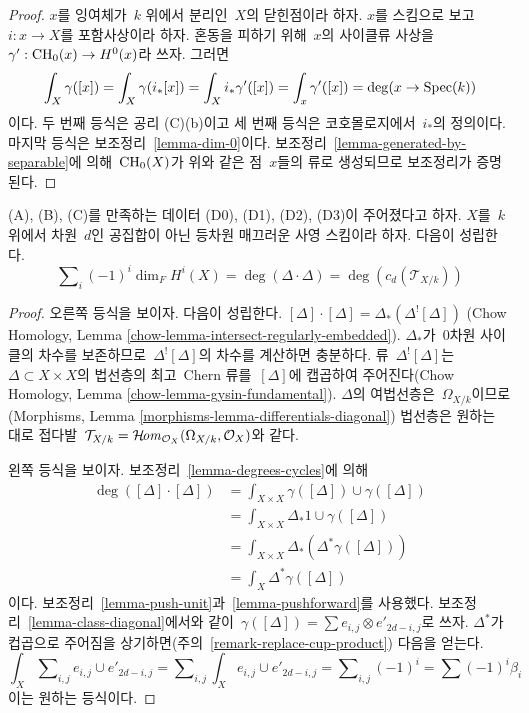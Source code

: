 \begin{proof}
$x$를 잉여체가\  $k$ 위에서 분리인\  $X$의 닫힌점이라 하자. $x$를
스킴으로 보고\  $i : x \to X$를 포함사상이라 하자. 혼동을 피하기 위해\ 
$x$의 사이클류 사상을\  $\gamma' : \mathop{\mathrm{CH}}\nolimits_0(x) \to H^0(x)$라 쓰자.
그러면
$$
\int_X \gamma([x]) = \int_X \gamma(i_*[x]) =
\int_X i_*\gamma'([x]) = \int_x \gamma'([x]) = \deg(x \to \mathop{\mathrm{Spec}}(k))
$$
이다. 두 번째 등식은 공리 (C)(b)이고 세 번째 등식은 코호몰로지에서\ 
$i_*$의 정의이다. 마지막 등식은 보조정리\  \ref{lemma-dim-0}이다.
보조정리\  \ref{lemma-generated-by-separable}에 의해\  $\mathop{\mathrm{CH}}\nolimits_0(X)$가
위와 같은 점\  $x$들의 류로 생성되므로 보조정리가 증명된다.
\end{proof}

\begin{lemma}
\label{lemma-square-diagonal}
(A), (B), (C)를 만족하는 데이터 (D0), (D1), (D2), (D3)이
주어졌다고 하자. $X$를\  $k$ 위에서 차원\  $d$인 공집합이 아닌 등차원
매끄러운 사영 스킴이라 하자. 다음이 성립한다.
$$
\sum\nolimits_i (-1)^i\dim_F H^i(X) =
\deg(\Delta \cdot \Delta) = \deg(c_d(\mathcal{T}_{X/k}))
$$
\end{lemma}

\begin{proof}
오른쪽 등식을 보이자. 다음이 성립한다.
$[\Delta] \cdot [\Delta] = \Delta_*(\Delta^![\Delta])$
(Chow Homology, Lemma \ref{chow-lemma-intersect-regularly-embedded}).
$\Delta_*$가\  $0$차원 사이클의 차수를 보존하므로\ 
$\Delta^![\Delta]$의 차수를 계산하면 충분하다. 류\ 
$\Delta^![\Delta]$는\  $\Delta \subset X \times X$의 법선층의 최고\ 
Chern 류를\  $[\Delta]$에 캡곱하여 주어진다(Chow Homology, Lemma
\ref{chow-lemma-gysin-fundamental}). $\Delta$의 여법선층은\ 
$\Omega_{X/k}$이므로(Morphisms, Lemma
\ref{morphisms-lemma-differentials-diagonal}) 법선층은 원하는 대로
접다발\  $\mathcal{T}_{X/k} = \mathop{\mathcal{H}\!\mathit{om}}\nolimits_{\mathcal{O}_X}(\Omega_{X/k}, \mathcal{O}_X)$와
같다.

\medskip\noindent
왼쪽 등식을 보이자. 보조정리\  \ref{lemma-degrees-cycles}에 의해
\begin{align*}
\deg([\Delta] \cdot [\Delta])
& =
\int_{X \times X} \gamma([\Delta]) \cup \gamma([\Delta]) \\
& =
\int_{X \times X} \Delta_*1 \cup \gamma([\Delta]) \\
& =
\int_{X \times X} \Delta_*(\Delta^*\gamma([\Delta])) \\
& =
\int_X \Delta^*\gamma([\Delta])
\end{align*}
이다. 보조정리\  \ref{lemma-push-unit}과\  \ref{lemma-pushforward}를
사용했다. 보조정리\  \ref{lemma-class-diagonal}에서와 같이\ 
$\gamma([\Delta]) = \sum  e_{i, j} \otimes e'_{2d - i , j}$로 쓰자.
$\Delta^*$가 컵곱으로 주어짐을 상기하면(주의\ 
\ref{remark-replace-cup-product}) 다음을 얻는다.
$$
\int_X \sum\nolimits_{i, j} e_{i, j} \cup e'_{2d - i, j} =
\sum\nolimits_{i, j} \int_X e_{i, j} \cup e'_{2d - i, j} =
\sum\nolimits_{i, j} (-1)^i = \sum (-1)^i\beta_i
$$
이는 원하는 등식이다.
\end{proof}

